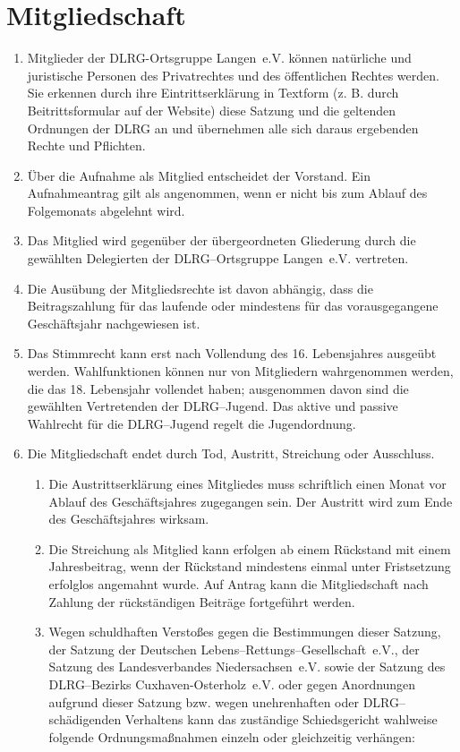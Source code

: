 \documentclass[%
12pt, %
a4paper, %
headsepline, %
parskip, %
headings=normal, %
]{scrreprt}
\begin{document}
\section{Mitgliedschaft}
\label{sec:mitgliedschaft}
\begin{enumerate}
    \item Mitglieder der DLRG-Ortsgruppe Langen~e.V. können natürliche und juristische Personen des Privatrechtes und des öffentlichen Rechtes werden. Sie erkennen durch ihre Eintrittserklärung in Textform (z. B. durch Beitrittsformular auf der Website) diese Satzung und die geltenden Ordnungen der DLRG an und übernehmen alle sich daraus ergebenden Rechte und Pflichten.
    \item Über die Aufnahme als Mitglied entscheidet der Vorstand. Ein Aufnahmeantrag gilt als angenommen, wenn er nicht bis zum Ablauf des Folgemonats abgelehnt wird.
    \item Das Mitglied wird gegenüber der übergeordneten Gliederung durch die gewählten Delegierten der DLRG--Ortsgruppe Langen~e.V. vertreten.
    \item Die Ausübung der Mitgliedsrechte ist davon abhängig, dass die Beitragszahlung für das laufende oder mindestens für das vorausgegangene Geschäftsjahr nachgewiesen ist.
    \item Das Stimmrecht kann erst nach Vollendung des 16. Lebensjahres ausgeübt werden. Wahlfunktionen können nur von Mitgliedern wahrgenommen werden, die das 18. Lebensjahr vollendet haben; ausgenommen davon sind die gewählten Vertretenden der DLRG--Jugend. Das aktive und passive Wahlrecht für die DLRG--Jugend regelt die Jugendordnung.
    \item Die Mitgliedschaft endet durch Tod, Austritt, Streichung oder Ausschluss.\begin{enumerate}[noitemsep]
        \item Die Austrittserklärung eines Mitgliedes muss schriftlich einen Monat vor Ablauf des Geschäftsjahres zugegangen sein. Der Austritt wird zum Ende des Geschäftsjahres wirksam.
        \item Die Streichung als Mitglied kann erfolgen ab einem Rückstand mit einem Jahresbeitrag, wenn der Rückstand mindestens einmal unter Fristsetzung erfolglos angemahnt wurde. Auf Antrag kann die Mitgliedschaft nach Zahlung der rückständigen Beiträge fortgeführt werden.
        \item Wegen schuldhaften Verstoßes gegen die Bestimmungen dieser Satzung, der Satzung der Deutschen Lebens--Rettungs--Gesellschaft~e.V., der Satzung des Landesverbandes Niedersachsen~e.V. sowie der Satzung des DLRG--Bezirks Cuxhaven-Osterholz~e.V. oder gegen Anordnungen aufgrund dieser Satzung bzw. wegen unehrenhaften oder DLRG--schädigenden Verhaltens kann das zuständige Schiedsgericht wahlweise folgende Ordnungsmaßnahmen einzeln oder gleichzeitig verhängen:\begin{enumerate}

\end{enumerate}
\end{enumerate}
\end{enumerate}
\end{document}
